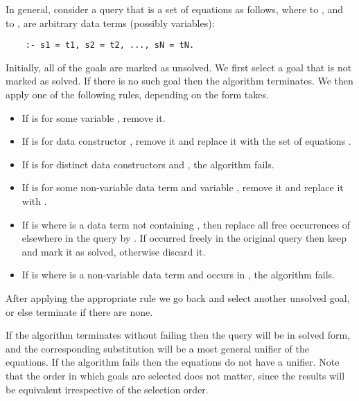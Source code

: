 In general, consider a query
that is a set of equations as follows,
where  to ,
and  to ,
are arbitrary data terms (possibly variables):
\begin{verbatim}
    :- s1 = t1, s2 = t2, ..., sN = tN.
\end{verbatim}
Initially, all of the goals are marked as unsolved.
We first select a goal  that is not marked as solved.
If there is no such goal then the algorithm terminates.
We then apply one of the following rules,
depending on the form  takes.
\begin{itemize}
\item
If  is
for some variable ,
remove it.
\item
If  is
for data constructor ,
remove it and replace it with the set of equations
.
\item
If  is
for distinct data constructors  and ,
the algorithm fails.
\item
If  is
for some non-variable data term 
and variable ,
remove it and replace it with
.
\item
If  is
where  is a data term not containing ,
then replace all free occurrences of 
elsewhere in the query
by .
If  occurred freely in the original query
then keep  and mark it as solved,
otherwise discard it.
\item
If  is
where  is a non-variable data term
and  occurs in ,
the algorithm fails.
\end{itemize}
After applying the appropriate rule
we go back and select another unsolved goal,
or else terminate if there are none.

If the algorithm terminates without failing
then the query will be in solved form,
and the corresponding substitution
will be a most general unifier of the equations.
If the algorithm fails then
the equations do not have a unifier.
Note that the order in which goals are selected does not matter,
since the results will be equivalent irrespective of
the selection order.

